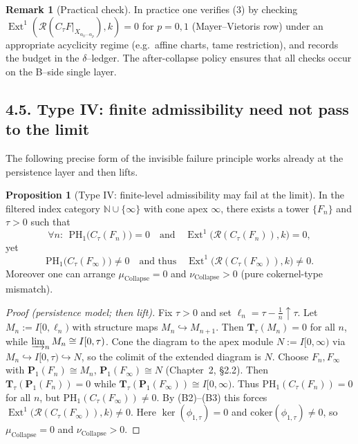 \documentclass[11pt]{article}
\numberwithin{equation}{section}
\theoremstyle{plain}
\theoremstyle{definition}
\theoremstyle{remark}
\DeclareMathOperator{\Ext}{Ext}
\theoremstyle{plain}
\theoremstyle{definition}
\numberwithin{equation}{section}
\newtheorem{proposition}[theorem]{Proposition}
\theoremstyle{definition}
\newtheorem{remark}[theorem]{Remark}
\DeclareRobustCommand{\muc}{\mu_{\mathrm{Collapse}}}
\DeclareRobustCommand{\nuc}{\nu_{\mathrm{Collapse}}}
\numberwithin{equation}{section}
\theoremstyle{plain}
\theoremstyle{definition}
\theoremstyle{remark}
\providecommand{\muc}{\mu_{\mathrm{Collapse}}}
\providecommand{\nuc}{\nu_{\mathrm{Collapse}}}
\begin{document}
\begin{remark}[Practical check]
In practice one verifies (3) by checking $\Ext^1(\mathcal{R}(C_\tau F|_{X_{\alpha_0\cdots\alpha_p}}),k)=0$ for $p=0,1$ (Mayer–Vietoris row) under an appropriate acyclicity regime (e.g.\ affine charts, tame restriction), and records the budget in the $\delta$–ledger. The after-collapse policy ensures that all checks occur on the B–side single layer.
\end{remark}

\subsection*{4.5. Type IV: finite admissibility need not pass to the limit}
The following precise form of the invisible failure principle works already at the persistence layer and then lifts.

\begin{proposition}[Type IV: finite-level admissibility may fail at the limit]\label{prop:type4}
In the filtered index category $\mathbb{N}\cup\{\infty\}$ with cone apex $\infty$, there exists a tower $\{F_n\}$ and $\tau>0$ such that
\[
\forall n:\ \ \mathrm{PH}_1\!\big(C_\tau(F_n)\big)=0\quad\text{and}\quad \Ext^1\!\big(\mathcal{R}(C_\tau(F_n)),k\big)=0,
\]
yet
\[
\mathrm{PH}_1\!\big(C_\tau(F_\infty)\big)\neq 0\quad\text{and thus}\quad \Ext^1\!\big(\mathcal{R}(C_\tau(F_\infty)),k\big)\neq 0.
\]
Moreover one can arrange $\muc=0$ and $\nuc>0$ (pure cokernel-type mismatch).
\end{proposition}

\begin{proof}[Proof (persistence model; then lift)]
Fix $\tau>0$ and set $\ell_n=\tau-\frac{1}{n}\uparrow\tau$. Let $M_n:=I[0,\ell_n)$ with structure maps $M_n\hookrightarrow M_{n+1}$. Then $\mathbf{T}_\tau(M_n)=0$ for all $n$, while $\varinjlim_n M_n\cong I[0,\tau)$. Cone the diagram to the apex module $N:=I[0,\infty)$ via $M_n\hookrightarrow I[0,\tau)\hookrightarrow N$, so the colimit of the extended diagram is $N$. Choose $F_n,F_\infty$ with $\mathbf{P}_1(F_n)\cong M_n$, $\mathbf{P}_1(F_\infty)\cong N$ (Chapter~2, §2.2). Then $\mathbf{T}_\tau(\mathbf{P}_1(F_n))=0$ while $\mathbf{T}_\tau(\mathbf{P}_1(F_\infty))\cong I[0,\infty)$. Thus $\mathrm{PH}_1(C_\tau(F_n))=0$ for all $n$, but $\mathrm{PH}_1(C_\tau(F_\infty))\neq 0$. By \textup{(B2)}–\textup{(B3)} this forces $\Ext^1\!\big(\mathcal{R}(C_\tau(F_\infty)),k\big)\neq 0$. Here $\ker(\phi_{1,\tau})=0$ and $\mathrm{coker}(\phi_{1,\tau})\neq 0$, so $\muc=0$ and $\nuc>0$.
\end{proof}
\end{document}

